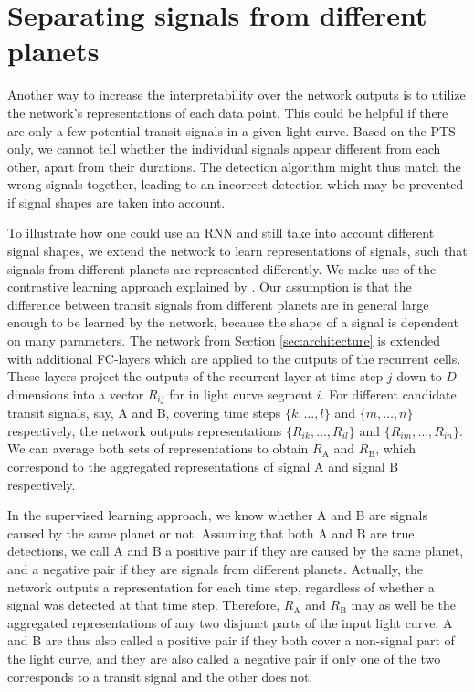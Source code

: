 
\section{Separating signals from different planets}
\label{sec:rnn_repr}


Another way to increase the interpretability over the network outputs is to utilize the network's representations of each data point. This could be helpful if there are only a few potential transit signals in a given light curve. Based on the PTS only, we cannot tell whether the individual signals appear different from each other, apart from their durations. The detection algorithm might thus match the wrong signals together, leading to an incorrect detection which may be prevented if signal shapes are taken into account. 

To illustrate how one could use an RNN and still take into account different signal shapes, we extend the network to learn representations of signals, such that signals from different planets are represented differently. We make use of the contrastive learning approach explained by \cite{le2020contrastive}. Our assumption is that the difference between transit signals from different planets are in general large enough to be learned by the network, because the shape of a signal is dependent on many parameters. The network from Section \ref{sec:architecture} is extended with additional FC-layers which are applied to the outputs of the recurrent cells. These layers project the outputs of the recurrent layer at time step $j$ down to $D$ dimensions into a vector $R_{ij}$ for in light curve segment $i$. For different candidate transit signals, say, A and B, covering time steps $\{k,\dots,l\}$ and $\{m,\dots,n\}$ respectively, the network outputs representations $\{R_{ik},\dots,R_{il}\}$ and $\{R_{im},\dots,R_{in}\}$. We can average both sets of representations to obtain $R_\text{A}$ and $R_\text{B}$, which correspond to the aggregated representations of signal A and signal B respectively. 

In the supervised learning approach, we know whether A and B are signals caused by the same planet or not. Assuming that both A and B are true detections, we call A and B a positive pair if they are caused by the same planet, and a negative pair if they are signals from different planets. Actually, the network outputs a representation for each time step, regardless of whether a signal was detected at that time step. Therefore, $R_\text{A}$ and $R_\text{B}$ may as well be the aggregated representations of any two disjunct parts of the input light curve. A and B are thus also called a positive pair if they both cover a non-signal part of the light curve, and they are also called a negative pair if only one of the two corresponds to a transit signal and the other does not.



